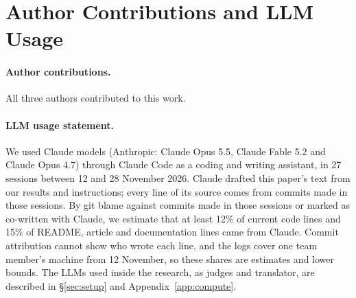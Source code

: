 \documentclass[11pt]{article}
\begin{document}
\section{Author Contributions and LLM Usage}\label{app:llm}

\paragraph{Author contributions.} All three authors contributed to this work.

\paragraph{LLM usage statement.} We used Claude models (Anthropic: Claude Opus 5.5, Claude Fable 5.2 and Claude
Opus 4.7) through Claude Code as a coding and writing assistant, in 27 sessions between 12 and 28 November 2026.
Claude drafted this paper's text from our results and instructions; every line of its source comes from commits made
in those sessions. By git blame against commits made in those sessions or marked as co-written with Claude, we
estimate that at least 12\% of current code lines and 15\% of README, article and documentation lines came from
Claude. Commit attribution cannot show who wrote each line, and the logs cover one team member's machine from 12
November, so these shares are estimates and lower bounds. The LLMs used inside the research, as judges and
translator, are described in \S\ref{sec:setup} and Appendix~\ref{app:compute}.

\label{lastpage}
\end{document}
